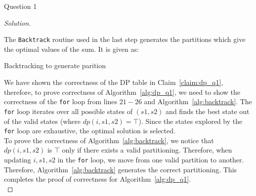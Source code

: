 \begin{solution}{Question 1}
\begin{proof}[Solution]
\begin{algorithm}[H]
\begin{algorithmic}[1]
                        \EndIf{}
                    \EndFor{}
                        
                \EndProcedure{}
            \end{algorithmic}
        \end{algorithm}
        The \texttt{Backtrack} routine used in the last step generates the partitions which give the optimal values of the sum. It is given as:
        \begin{algorithm}[H]
            \caption{Backtracking to generate parition}\label{alg:backtrack}
            \begin{algorithmic}
                        \Else{}
                        \EndIf{}
                    \EndFor{}
                \EndProcedure{}
            \end{algorithmic}
        \end{algorithm}
        We have shown the correctness of the DP table in Claim~\ref{claim:dp_q1}, therefore, to prove correctness of Algorithm~\ref{alg:dp_q1}, we need to show the correctness of the \texttt{for} loop from lines $21-26$ and Algorithm~\ref{alg:backtrack}. The \texttt{for} loop iterates over all possible states of $(s1, s2)$ and finds the best state out of the valid states (where $dp(i, s1, s2)=\top$). Since the states explored by the \texttt{for} loop are exhaustive, the optimal
        solution is selected.\\
        To prove the correctness of Algorithm~\ref{alg:backtrack}, we notice that $dp(i, s1, s2)$ is $\top$ only if there exists a valid partitioning. Therefore, when updating $i, s1, s2$ in the \texttt{for} loop, we move from one valid partition to another. Therefore, Algorithm~\ref{alg:backtrack} generates the correct partitioning. This completes the proof of correctness for Algorithm~\ref{alg:dp_q1}.\\


\end{proof}
\end{solution}
